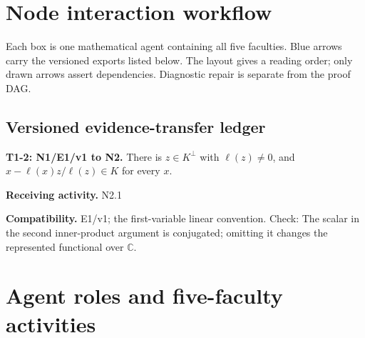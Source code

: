 \documentclass[preprint,12pt,aps,pra,showkeys,amsmath,amssymb,superscriptaddress,floatfix]{revtex4-2}
\theoremstyle{definition}
\theoremstyle{remark}
\newcommand{\field}[2]{\par\smallskip\noindent\textbf{#1.} #2\par}
\begin{document}
\clearpage\section{Node interaction workflow}

\begin{center}\end{center}

Each box is one mathematical agent containing all five faculties. Blue
arrows carry the versioned exports listed below. The layout gives a
reading order; only drawn arrows assert dependencies. Diagnostic repair
is separate from the proof DAG.

\subsection{Versioned evidence-transfer ledger}

\begingroup\small\linespread{1.05}\selectfont

\field{T1-2: N1/E1/v1 to N2}{There is \(z\in K^\perp\) with \(\ell(z)\ne0\), and
\(x-\ell(x)z/\ell(z)\in K\) for every \(x\).}

\field{Receiving activity}{N2.1}

\field{Compatibility}{E1/v1; the first-variable linear convention. Check: The scalar in the
second inner-product argument is conjugated; omitting it changes the
represented functional over \(\mathbb C\).}

\endgroup

\clearpage\section{Agent roles and five-faculty activities}\begingroup\small\linespread{1.05}\selectfont{}
\end{document}
